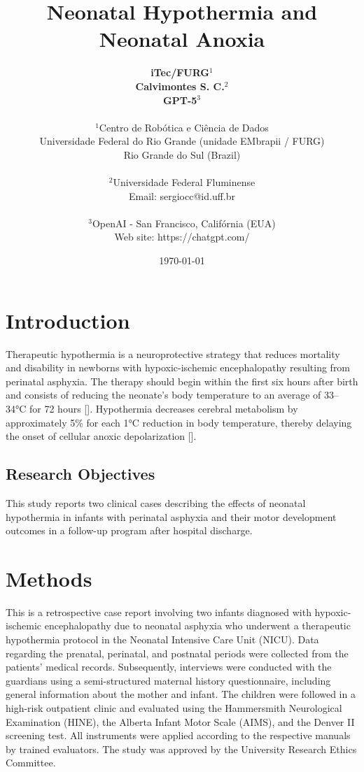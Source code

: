 \documentclass[11pt,a4paper]{article}
\title{\textbf{Neonatal Hypothermia and Neonatal Anoxia}}
\author{
	\textbf{iTec/FURG}$^{1}$ \\
	\textbf{Calvimontes S. C.}$^{2}$ \\
	\textbf{GPT-5}$^{3}$ \\
	\\
	\small $^{1}$Centro de Robótica e Ciência de Dados \\
	\small Universidade Federal do Rio Grande (unidade EMbrapii / FURG) \\
	\small Rio Grande do Sul (Brazil) \\
	\\
	\small $^{2}$Universidade Federal Fluminense \\
	\small Email: sergiocc@id.uff.br \\
	\\
	\small $^{3}$OpenAI - San Francisco, Califórnia (EUA) \\
	\small Web site: https://chatgpt.com/
}
\date{\today}
\begin{document}
	
	\maketitle
	
	\newpage
	
	\section{Introduction}
	
	Therapeutic hypothermia is a neuroprotective strategy that reduces mortality and disability in newborns with hypoxic-ischemic encephalopathy resulting from perinatal asphyxia. The therapy should begin within the first six hours after birth and consists of reducing the neonate’s body temperature to an average of 33–34°C for 72 hours [\cite{Azzopardi2014,Thayyil2021,Abate2021}]. Hypothermia decreases cerebral metabolism by approximately 5\% for each 1°C reduction in body temperature, thereby delaying the onset of cellular anoxic depolarization [\cite{Silveira2015}].
		
	\subsection{Research Objectives}
	This study reports two clinical cases describing the effects of neonatal hypothermia in infants with perinatal asphyxia and their motor development outcomes in a follow-up program after hospital discharge.
	
	\section{Methods}
	This is a retrospective case report involving two infants diagnosed with hypoxic-ischemic encephalopathy due to neonatal asphyxia who underwent a therapeutic hypothermia protocol in the Neonatal Intensive Care Unit (NICU). Data regarding the prenatal, perinatal, and postnatal periods were collected from the patients’ medical records. Subsequently, interviews were conducted with the guardians using a semi-structured maternal history questionnaire, including general information about the mother and infant.
	The children were followed in a high-risk outpatient clinic and evaluated using the Hammersmith Neurological Examination (HINE), the Alberta Infant Motor Scale (AIMS), and the Denver II screening test. All instruments were applied according to the respective manuals by trained evaluators. The study was approved by the University Research Ethics Committee.
	
\end{document}
